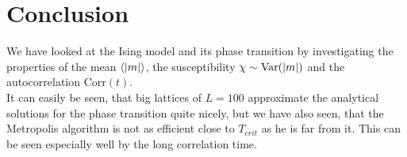\section{Conclusion}

We have looked at the Ising model and its phase transition by investigating the properties of the mean $\left\langle\left\vert m \right\vert\right\rangle$, the susceptibility $\chi \sim \text{Var}(\left\vert m \right\vert)$ and the autocorrelation Corr$(t)$.\\
It can easily be seen, that big lattices of $L = 100$ approximate the analytical solutions for the phase transition quite nicely, but we have also seen, that the Metropolis algorithm is not as efficient close to $T_{crit}$ as he is far from it. This can be seen especially well by the long correlation time.

